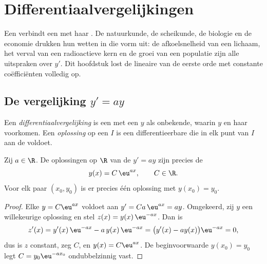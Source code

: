 \chapter{Differentiaalvergelijkingen}\label{ch:g12:diffeq}

Een  verbindt een  met haar . De
natuurkunde, de scheikunde, de biologie en de economie drukken hun wetten in
die vorm uit: de afkoelsnelheid van een lichaam, het verval van een
radioactieve kern en de groei van een populatie zijn alle uitspraken over
$y'$. Dit hoofdstuk lost de lineaire  van de eerste orde met
constante coëfficiënten volledig op.

\section{De vergelijking \texorpdfstring{$y' = ay$}{y' = ay}}

\begin{definition}[Differentiaalvergelijking]\label{def:g12:diffeq:ode}
Een \emph{differentiaalvergelijking} is een
 met een  $y$ als onbekende, waarin $y$ en haar 
voorkomen. Een \emph{oplossing} op een  $I$ is een differentieerbare
 die in elk punt van $I$ aan de  voldoet.
\end{definition}

\begin{theorem}[Oplossingen van $y' = ay$]\label{thm:g12:diffeq:homogeneous}
Zij $a \in \R$. De oplossingen op $\R$ van de  $y' = ay$ zijn
precies de 
\[
y(x) = C\,\eu^{ax}, \qquad C \in \R .
\]
Voor elk paar $(x_0, y_0)$ is er precies één oplossing met $y(x_0) = y_0$.
\end{theorem}

\begin{proof}
Elke $y = C\eu^{ax}$ voldoet aan $y' = Ca\,\eu^{ax} = ay$. Omgekeerd, zij $y$
een willekeurige oplossing en stel $z(x) = y(x)\,\eu^{-ax}$. Dan is
\[
z'(x) = y'(x)\,\eu^{-ax} - a\,y(x)\,\eu^{-ax}
= \bigl(y'(x) - a y(x)\bigr)\eu^{-ax} = 0,
\]
dus is $z$ constant, zeg $C$, en $y(x) = C\eu^{ax}$. De beginvoorwaarde
$y(x_0) = y_0$ legt $C = y_0 \eu^{-a x_0}$ ondubbelzinnig vast.
\end{proof}


